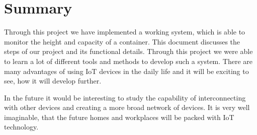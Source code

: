 \documentclass{article}
\begin{document}
\section{Summary}
Through this project we have implemented a working system, which is able to monitor the height and capacity of a container. This document discusses the steps of our project and its functional details. Through this project we were able to learn a lot of different tools and methods to develop such a system. There are many advantages of using IoT devices in the daily life and it will be exciting to see, how it will develop further.

In the future it would be interesting to study the capability of interconnecting with other
devices and creating a more broad network of devices. It is very well imaginable, that the future homes and workplaces will be packed with IoT technology.
\end{document}
